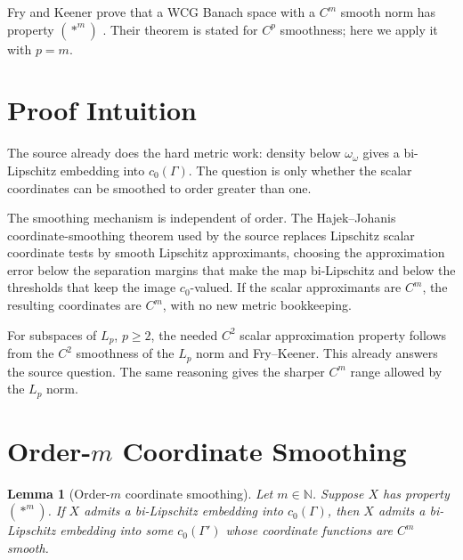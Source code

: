 \documentclass[11pt]{article}
\newtheorem{lemma}{Lemma}
\begin{document}
Fry and Keener prove that a WCG Banach space with a \(C^m\) smooth norm has
property \((\ast^m)\) \cite[Theorem 4]{FryKeener09070241}.  Their theorem is
stated for \(C^p\) smoothness; here we apply it with \(p=m\).

\section*{Proof Intuition}

The source already does the hard metric work: density below
\(\omega_\omega\) gives a bi-Lipschitz embedding into \(c_0(\Gamma)\).  The
question is only whether the scalar coordinates can be smoothed to order
greater than one.

The smoothing mechanism is independent of order.  The Hajek--Johanis
coordinate-smoothing theorem used by the source replaces Lipschitz scalar
coordinate tests by smooth Lipschitz approximants, choosing the approximation
error below the separation margins that make the map bi-Lipschitz and below
the thresholds that keep the image \(c_0\)-valued.  If the scalar
approximants are \(C^m\), the resulting coordinates are \(C^m\), with no new
metric bookkeeping.

For subspaces of \(L_p\), \(p\ge2\), the needed \(C^2\) scalar approximation
property follows from the \(C^2\) smoothness of the \(L_p\) norm and
Fry--Keener.  This already answers the source question.  The same reasoning
gives the sharper \(C^m\) range allowed by the \(L_p\) norm.

\section*{Order-\(m\) Coordinate Smoothing}

\begin{lemma}[Order-\(m\) coordinate smoothing]
\label{lem:coordinate}
Let \(m\in\mathbb N\).  Suppose \(X\) has property \((\ast^m)\).  If \(X\)
admits a bi-Lipschitz embedding into \(c_0(\Gamma)\), then \(X\) admits a
bi-Lipschitz embedding into some \(c_0(\Gamma')\) whose coordinate functions
are \(C^m\) smooth.
\end{lemma}
\end{document}
